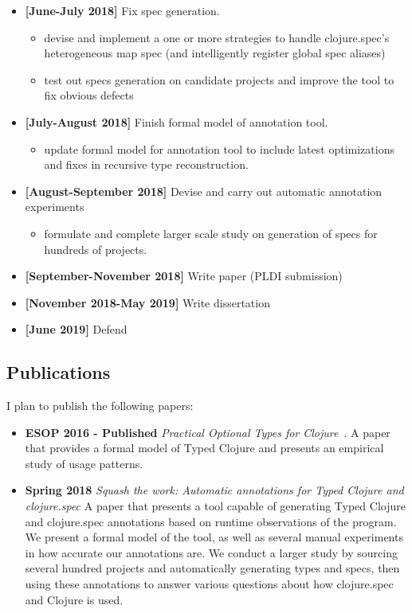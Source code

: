 \documentclass[9pt]{extarticle}
\begin{document}
\begin{itemize}
  \item \textbf{[June-July 2018]} Fix spec generation.
    \begin{itemize}
      \item devise and implement a one or more strategies to handle clojure.spec's
        heterogeneous map spec (and intelligently register global spec aliases)
      \item test out specs generation on candidate projects and improve the tool to fix obvious
        defects
    \end{itemize}
  \item \textbf{[July-August 2018]} Finish formal model of annotation tool.
    \begin{itemize}
      \item update formal model for annotation tool to include latest
        optimizations and fixes in recursive type reconstruction.
    \end{itemize}
  \item \textbf{[August-September 2018]} Devise and carry out automatic annotation experiments
    \begin{itemize}
      \item formulate and complete larger scale study on generation of specs for hundreds of projects.
    \end{itemize}
  \item \textbf{[September-November 2018]} Write paper (PLDI submission)
  \item \textbf{[November 2018-May 2019]} Write dissertation
  \item \textbf{[June 2019]} Defend
\end{itemize}

\subsection{Publications}

I plan to publish the following papers:

\begin{itemize}
  \item \textbf{ESOP 2016 - Published} \emph{Practical Optional Types for Clojure}~\cite{bonnaire2016practical}.
    A paper that provides a formal model of Typed Clojure and presents an empirical
    study of usage patterns.
  \item \textbf{Spring 2018} \emph{Squash the work: Automatic annotations for Typed Clojure and clojure.spec}
    A paper that presents a tool capable of generating Typed Clojure and clojure.spec
    annotations based on runtime observations of the program.
    We present a formal model of the tool, as well as several manual experiments in how
    accurate our annotations are.
    We conduct a larger study by sourcing several hundred projects and automatically
    generating types and specs, then using these annotations to answer various questions
    about how clojure.spec and Clojure is used.
\end{itemize}


\printbibliography
\end{document}
